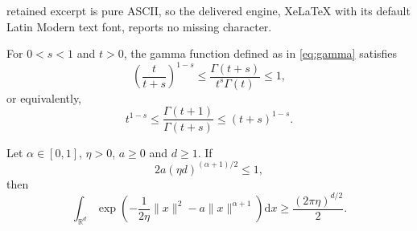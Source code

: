\documentclass[10pt,a4paper]{amsart}
\newcommand{\R}{\mathbb{R}}
\newcommand{\rd}{\mathrm{d}}
\begin{document}
retained excerpt is pure ASCII, so the delivered engine, XeLaTeX with its default Latin Modern text font, reports no missing character.
\begin{lemma}
For $0<s<1$ and $t>0$, the gamma function defined as in \eqref{eq:gamma}
satisfies 
\[
\left(\frac{t}{t+s}\right)^{1-s} \le \frac{\Gamma(t+s)}{t^s \Gamma(t)} \le 1,
\]
or equivalently,
\begin{equation}\label{ineq:Wendel}
    t^{1-s} \le \frac{\Gamma(t+1)}{\Gamma(t+s)} \le (t+s)^{1-s}.
\end{equation}
\end{lemma}

\begin{proposition}\label{prop:key}
Let $\alpha\in[0,1]$, $\eta>0$, $a\ge 0$ and $d\ge 1$. If 
    \begin{equation}\label{eq:aeta}
        2a(\eta d)^{(\alpha+1)/2} \le 1,
    \end{equation}
then
\begin{equation}\label{ineq:int}
    \int_{\R^d} \exp\left(-\frac{1}{2\eta}\|x\|^2 - a\|x\|^{\alpha+1}\right) \rd x
\ge \frac{(2\pi\eta)^{d/2}}2.
\end{equation}
\end{proposition}
\end{document}
